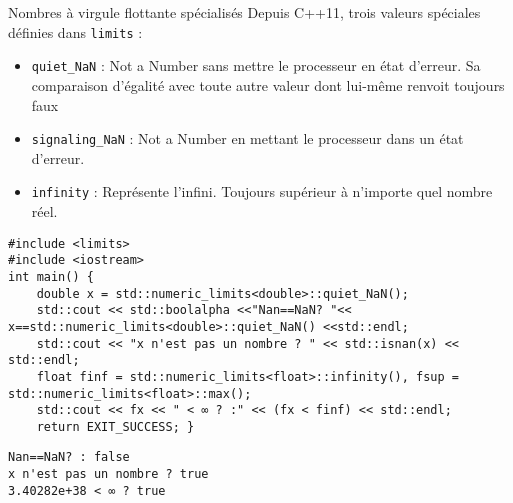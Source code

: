 \documentclass[compress,10pt,aspectratio=169]{beamer}
\begin{document}
\begin{frame}[fragile]{Nombres à virgule flottante spécialisés}
    \scriptsize 
    Depuis C++11, trois valeurs spéciales définies dans \texttt{limits} :
    \begin{itemize}
        \item \texttt{quiet\_NaN} : Not a Number sans mettre le processeur en état d'erreur. Sa comparaison d'égalité avec toute autre valeur dont lui-même renvoit toujours faux
        \item \texttt{signaling\_NaN} : Not a Number en mettant le processeur dans un état d'erreur.
        \item \texttt{infinity} : Représente l'infini. Toujours supérieur à n'importe quel nombre réel.
    \end{itemize}

    \begin{verbatim}
#include <limits>
#include <iostream>
int main() {
    double x = std::numeric_limits<double>::quiet_NaN();
    std::cout << std::boolalpha <<"Nan==NaN? "<< x==std::numeric_limits<double>::quiet_NaN() <<std::endl;
    std::cout << "x n'est pas un nombre ? " << std::isnan(x) << std::endl;
    float finf = std::numeric_limits<float>::infinity(), fsup = std::numeric_limits<float>::max();
    std::cout << fx << " < ∞ ? :" << (fx < finf) << std::endl;
    return EXIT_SUCCESS; }
\end{verbatim}
\vspace*{-2mm}
\begin{tcolorbox}[colback=black,coltext=white]
\begin{verbatim}
Nan==NaN? : false
x n'est pas un nombre ? true
3.40282e+38 < ∞ ? true
\end{verbatim}
\end{tcolorbox}        
\end{frame}
\end{document}
